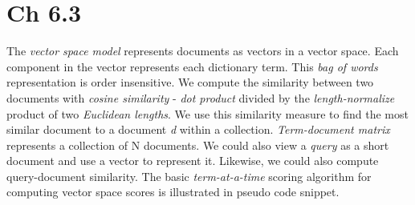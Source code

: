 \documentclass{sig-alternate-05-2015}
\begin{document}
\section{Ch 6.3}
The \textit{vector space model} represents documents as vectors in a vector space. Each component in the vector represents each dictionary term. This \textit{bag of words} representation is order insensitive. We compute the similarity between two documents with \textit{cosine similarity} - \textit{dot product} divided by the \textit{length-normalize} product of two \textit{Euclidean lengths}. We use this similarity measure to find the most similar document to a document \textit{d} within a collection. \textit{Term-document matrix} represents a collection of N documents. We could also view a \textit{query} as a short document and use a vector to represent it. Likewise, we could also compute query-document similarity. The basic \textit{term-at-a-time} scoring algorithm for computing vector space scores is illustrated in pseudo code snippet.
%

\end{document}
